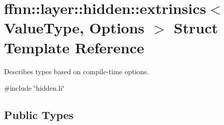 \hypertarget{structffnn_1_1layer_1_1hidden_1_1extrinsics}{\section{ffnn\-:\-:layer\-:\-:hidden\-:\-:extrinsics$<$ Value\-Type, Options $>$ Struct Template Reference}
\label{structffnn_1_1layer_1_1hidden_1_1extrinsics}
}


Describes types based on compile-\/time options.  




{\ttfamily \#include \char`\"{}hidden.\-h\char`\"{}}

\subsection*{Public Types}
